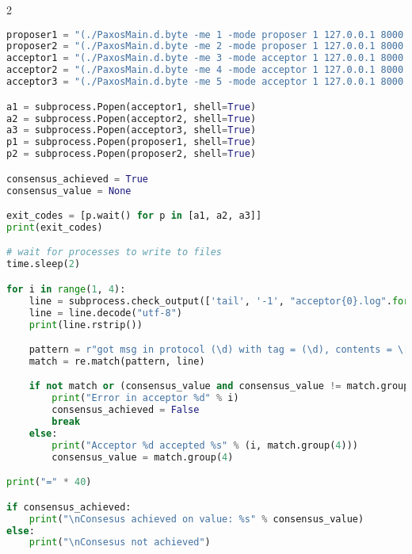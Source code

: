 \begin{landscape}
\begin{multicols*}{2}
\begin{lstlisting}[style=SourceCodeListing, language=Python]
proposer1 = "(./PaxosMain.d.byte -me 1 -mode proposer 1 127.0.0.1 8000 2 127.0.0.1 8001 3 127.0.0.1 8002 4 127.0.0.1 8003 5 127.0.0.1 8004 &) > proposer1.log 2>&1"
proposer2 = "(./PaxosMain.d.byte -me 2 -mode proposer 1 127.0.0.1 8000 2 127.0.0.1 8001 3 127.0.0.1 8002 4 127.0.0.1 8003 5 127.0.0.1 8004 &) > proposer2.log 2>&1"
acceptor1 = "(./PaxosMain.d.byte -me 3 -mode acceptor 1 127.0.0.1 8000 2 127.0.0.1 8001 3 127.0.0.1 8002 4 127.0.0.1 8003 5 127.0.0.1 8004 &) > acceptor1.log 2>&1"
acceptor2 = "(./PaxosMain.d.byte -me 4 -mode acceptor 1 127.0.0.1 8000 2 127.0.0.1 8001 3 127.0.0.1 8002 4 127.0.0.1 8003 5 127.0.0.1 8004 &) > acceptor2.log 2>&1"
acceptor3 = "(./PaxosMain.d.byte -me 5 -mode acceptor 1 127.0.0.1 8000 2 127.0.0.1 8001 3 127.0.0.1 8002 4 127.0.0.1 8003 5 127.0.0.1 8004 &) > acceptor3.log 2>&1"

a1 = subprocess.Popen(acceptor1, shell=True)
a2 = subprocess.Popen(acceptor2, shell=True)
a3 = subprocess.Popen(acceptor3, shell=True)
p1 = subprocess.Popen(proposer1, shell=True)
p2 = subprocess.Popen(proposer2, shell=True)

consensus_achieved = True
consensus_value = None

exit_codes = [p.wait() for p in [a1, a2, a3]]
print(exit_codes)

# wait for processes to write to files
time.sleep(2)

for i in range(1, 4):
    line = subprocess.check_output(['tail', '-1', "acceptor{0}.log".format(i)])
    line = line.decode("utf-8")
    print(line.rstrip())

    pattern = r"got msg in protocol (\d) with tag = (\d), contents = \[(\d); (\d)\]"
    match = re.match(pattern, line)

    if not match or (consensus_value and consensus_value != match.group(4)):
        print("Error in acceptor %d" % i)
        consensus_achieved = False
        break
    else:
        print("Acceptor %d accepted %s" % (i, match.group(4)))
        consensus_value = match.group(4)

print("=" * 40)

if consensus_achieved:
    print("\nConsesus achieved on value: %s" % consensus_value)
else:
    print("\nConsesus not achieved")
\end{lstlisting}

\end{multicols*}

\end{landscape}
\restoregeometry
